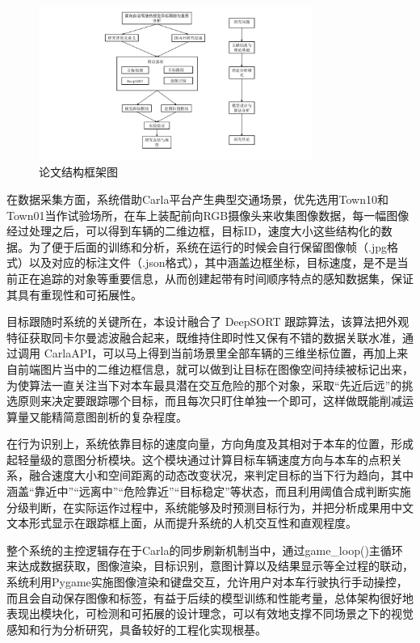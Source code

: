 \begin{figure}[H]
    \centering
    \includegraphics[width=0.8\textwidth]{images/图1 系统技术路线图.pdf}  %
    \caption{论文结构框架图}
    \label{fig:example_image}  %
\end{figure}

在数据采集方面，系统借助Carla平台产生典型交通场景，优先选用Town10和Town01当作试验场所，在车上装配前向RGB摄像头来收集图像数据，每一幅图像经过处理之后，可以得到车辆的二维边框，目标ID，速度大小这些结构化的数据。为了便于后面的训练和分析，系统在运行的时候会自行保留图像帧（.jpg格式）以及对应的标注文件（.json格式），其中涵盖边框坐标，目标速度，是不是当前正在追踪的对象等重要信息，从而创建起带有时间顺序特点的感知数据集，保证其具有重现性和可拓展性。

目标跟随时系统的关键所在，本设计融合了 DeepSORT 跟踪算法，该算法把外观特征获取同卡尔曼滤波融合起来，既维持住即时性又保有不错的数据关联水准，通过调用 CarlaAPI，可以马上得到当前场景里全部车辆的三维坐标位置，再加上来自前端图片当中的二维边框信息，就可以做到让目标在图像空间持续被标记出来，为使算法一直关注当下对本车最具潜在交互危险的那个对象，采取“先近后远”的挑选原则来决定要跟踪哪个目标，而且每次只盯住单独一个即可，这样做既能削减运算量又能精简意图剖析的复杂程度。

在行为识别上，系统依靠目标的速度向量，方向角度及其相对于本车的位置，形成起轻量级的意图分析模块。这个模块通过计算目标车辆速度方向与本车的点积关系，融合速度大小和空间距离的动态改变状况，来判定目标的当下行为趋向，其中涵盖“靠近中”“远离中”“危险靠近”“目标稳定”等状态，而且利用阈值合成判断实施分级判断，在实际运作过程中，系统能够及时预测目标行为，并把分析成果用中文文本形式显示在跟踪框上面，从而提升系统的人机交互性和直观程度。

整个系统的主控逻辑存在于Carla的同步刷新机制当中，通过game\_loop()主循环来达成数据获取，图像渲染，目标识别，意图计算以及结果显示等全过程的联动，系统利用Pygame实施图像渲染和键盘交互，允许用户对本车行驶执行手动操控，而且会自动保存图像和标签，有益于后续的模型训练和性能考量，总体架构很好地表现出模块化，可检测和可拓展的设计理念，可以有效地支撑不同场景之下的视觉感知和行为分析研究，具备较好的工程化实现根基。




\begin{tabular}{l l}
\end{tabular}

